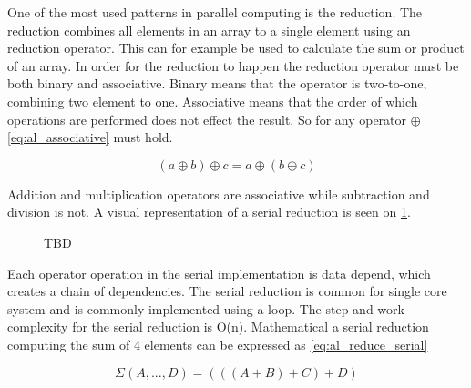 One of the most used patterns in parallel computing is the reduction. The reduction combines all elements in an array to a single element using an reduction operator. This can for example be used to calculate the sum or product of an array. In order for the reduction to happen the reduction operator must be both binary and associative. Binary means that the operator is two-to-one, combining two element to one. Associative means that the order of which operations are performed does not effect the result. So for any operator $\oplus$ \cref{eq:al_associative} must hold.

\begin{equation} 
\label{eq:al_associative}
	(a \oplus b) \oplus c = a \oplus (b \oplus c)
\end{equation}

Addition and multiplication operators are associative while subtraction and division is not. A visual representation of a serial reduction is seen on \cref{fig:reduce_serial}. 

\begin{figure}[ht]
	\centering
	\caption{TBD}
	\label{fig:reduce_serial}
\end{figure}

Each operator operation in the serial implementation is data depend, which creates a chain of dependencies. The serial reduction is common for single core system and is commonly implemented using a loop. The step and work complexity for the serial reduction is O(n). Mathematical a serial reduction computing the sum of 4 elements can be expressed as \cref{eq:al_reduce_serial}

\begin{equation}
\label{eq:al_reduce_serial}
\Sigma(A,...,D) = (((A + B) + C) + D) 
\end{equation} 

